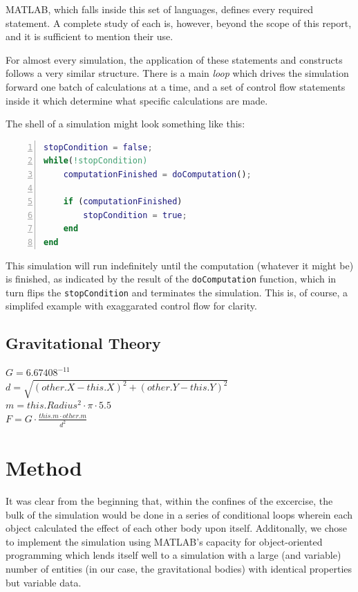 \documentclass[11pt]{article}
\begin{document}
MATLAB, which falls inside this set of languages, defines every required statement. A complete study of each is, however, beyond the scope of this report, and it is sufficient to mention their use.

For almost every simulation, the application of these statements and constructs follows a very similar structure. There is a main \emph{loop} which drives the simulation forward one batch of calculations at a time, and a set of control flow statements inside it which determine what specific calculations are made.

The shell of a simulation might look something like this:
\begin{lstlisting}[language=Matlab, tabsize=4, numbers=left, frame=shadowbox]
stopCondition = false;
while(!stopCondition)
	computationFinished = doComputation();
	
	if (computationFinished)
		stopCondition = true;
	end
end
\end{lstlisting}
This simulation will run indefinitely until the computation (whatever it might be) is finished, as indicated by
the result of the \verb|doComputation| function, which in turn flips the \verb|stopCondition| and terminates the 
simulation. This is, of course, a simplifed example with exaggarated control flow for clarity.

\subsection{Gravitational Theory}
$G = 6.67408^{-11}$\\
$d = \sqrt{(other.X - this.X)^{2} + (other.Y - this.Y)^{2}}$\\
$m = this.Radius^{2} \cdot \pi \cdot 5.5$\\
$F = G \cdot \frac{this.m \cdot other.m}{d^{2}}$

\pagebreak
\section{Method}
It was clear from the beginning that, within the confines of the excercise, the bulk of the simulation would be done in a series of conditional loops wherein each object calculated the effect of each other body upon itself. Additonally, we chose to implement the simulation using MATLAB's capacity for object-oriented programming which lends itself well to a simulation with a large (and variable) number of entities (in our case, the gravitational bodies) with identical properties but variable data.
\end{document}
